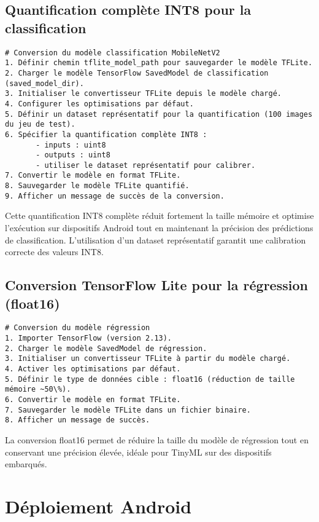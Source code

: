 \subsection{Quantification complète INT8 pour la classification}
{\small
	\begin{verbatim}
# Conversion du modèle classification MobileNetV2 
1. Définir chemin tflite_model_path pour sauvegarder le modèle TFLite.
2. Charger le modèle TensorFlow SavedModel de classification (saved_model_dir).
3. Initialiser le convertisseur TFLite depuis le modèle chargé.
4. Configurer les optimisations par défaut.
5. Définir un dataset représentatif pour la quantification (100 images du jeu de test).
6. Spécifier la quantification complète INT8 :
       - inputs : uint8
       - outputs : uint8
       - utiliser le dataset représentatif pour calibrer.
7. Convertir le modèle en format TFLite.
8. Sauvegarder le modèle TFLite quantifié.
9. Afficher un message de succès de la conversion.
\end{verbatim}}

Cette quantification INT8 complète réduit fortement la taille mémoire et optimise l’exécution sur dispositifs Android tout en maintenant la précision des prédictions de classification. L’utilisation d’un dataset représentatif garantit une calibration correcte des valeurs INT8.


\subsection{Conversion TensorFlow Lite pour la régression (float16)}
\begin{verbatim}
# Conversion du modèle régression 
1. Importer TensorFlow (version 2.13).
2. Charger le modèle SavedModel de régression.
3. Initialiser un convertisseur TFLite à partir du modèle chargé.
4. Activer les optimisations par défaut.
5. Définir le type de données cible : float16 (réduction de taille mémoire ~50\%).
6. Convertir le modèle en format TFLite.
7. Sauvegarder le modèle TFLite dans un fichier binaire.
8. Afficher un message de succès.
\end{verbatim}

La conversion float16 permet de réduire la taille du modèle de régression tout en conservant une précision élevée, idéale pour TinyML sur des dispositifs embarqués.

\section{Déploiement Android}
\label{sec:deploiement_android}

